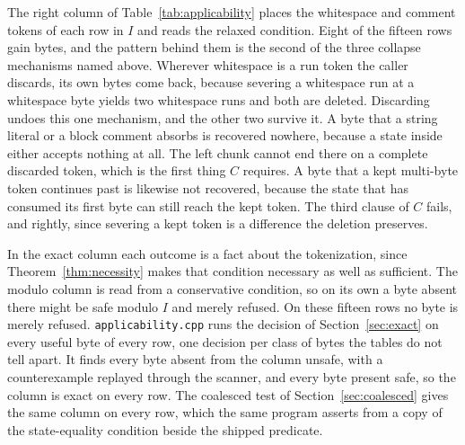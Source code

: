 \documentclass[11pt,a4paper]{article}
\theoremstyle{definition}
\theoremstyle{plain}
\newcommand{\code}[1]{\texttt{#1}}
\begin{document}
The right column of Table~\ref{tab:applicability} places the whitespace and comment tokens of each row in $I$ and reads
the relaxed condition. Eight of the fifteen rows gain bytes, and the pattern behind them is the second of the three
collapse mechanisms named above. Wherever whitespace is a run token the caller discards, its own bytes come back,
because severing a whitespace run at a whitespace byte yields two whitespace runs and both are deleted. Discarding
undoes this one mechanism, and the other two survive it. A byte that a string literal or a block comment absorbs is
recovered nowhere, because a state inside either accepts nothing at all. The left chunk cannot end there on a complete
discarded token, which is the first thing $C$ requires. A byte that a kept multi-byte token continues past is likewise
not recovered, because the state that has consumed its first byte can still reach the kept token. The third clause of
$C$ fails, and rightly, since severing a kept token is a difference the deletion preserves.

In the exact column each outcome is a fact about the tokenization, since Theorem~\ref{thm:necessity} makes that
condition necessary as well as sufficient. The modulo column is read from a conservative condition, so on its own a byte
absent there might be safe modulo $I$ and merely refused. On these fifteen rows no byte is merely refused.
\code{applicability.cpp} runs the decision of Section~\ref{sec:exact} on every useful byte of every row, one decision
per class of bytes the tables do not tell apart. It finds every byte absent from the column unsafe, with a
counterexample replayed through the scanner, and every byte present safe, so the column is exact on every row. The
coalesced test of Section~\ref{sec:coalesced} gives the same column on every row, which the same program asserts from a
copy of the state-equality condition beside the shipped predicate.
\end{document}
